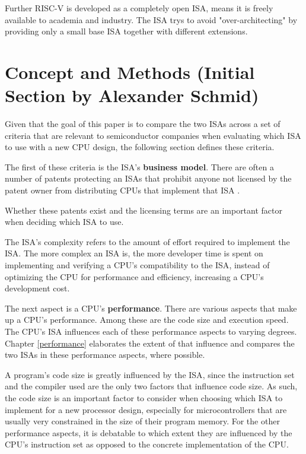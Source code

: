 \documentclass[conference]{IEEEtran}
\begin{document}
	Further RISC-V is developed as a completely open ISA, means it is freely available to academia and industry. The \gls{ISA} trys to avoid "over-architecting" by providing only a small base \gls{ISA} together with different extensions. \cite[page 1]{Waterman2017}
	
\section{Concept and Methods (Initial Section by Alexander Schmid)}
	\label{ref:concept}

Given that the goal of this paper is to compare the two \glspl{ISA}
across a set of criteria that are relevant to semiconductor companies when evaluating which \gls{ISA} to use with a new CPU design,
the following section defines these criteria.

The first of these criteria is the \gls{ISA}'s \textbf{business model}. There are often a number of patents protecting an \glspl{ISA} that prohibit anyone not licensed
by the patent owner from distributing \glspl{CPU} that implement that \gls{ISA} \cite{Tang2011}.

Whether these patents exist and the licensing terms
are an important factor when deciding which \gls{ISA} to use.

The \gls{ISA}'s complexity refers to the amount of effort required to implement the \gls{ISA}. The more complex an \gls{ISA} is, the more developer
time is spent on implementing and verifying a \gls{CPU}'s compatibility to the \gls{ISA}, instead of optimizing the \gls{CPU} for performance and efficiency,
increasing a \gls{CPU}'s development cost. \cite{Patterson1980}

The next aspect is a \gls{CPU}'s \textbf{performance}. There are various aspects that make up a \gls{CPU}'s performance.
Among these are the code size and execution speed.
The \gls{CPU}'s \gls{ISA} influences each of these performance aspects to varying degrees. Chapter \ref{performance} elaborates
the extent of that influence and compares the two \glspl{ISA} in these performance aspects, where possible.

A program's code size is greatly influenced by the \gls{ISA}, since the instruction set and the compiler used are the only two factors that influence
code size. As such, the code size is an important factor to consider when choosing which \gls{ISA} to implement for a new processor design, especially
for microcontrollers that are usually very constrained in the size of their program memory.
For the other performance aspects, it is debatable to which extent they are influenced by the \gls{CPU}'s instruction set as opposed
to the concrete implementation of the CPU. \cite{Blem2013} \cite{Akram2017}
\end{document}
